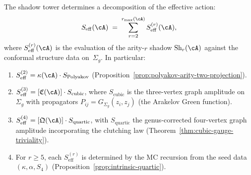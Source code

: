 \begin{proposition}
\label{prop:effective-action-decomposition}
\ClaimStatusProvedElsewhere
{}
The shadow tower determines a decomposition of the effective
action:
\begin{equation}\label{eq:effective-action-decomposition}
  S_{\mathrm{eff}}(\cA)
  \;=\;
  \sum_{r=2}^{r_{\max}(\cA)}
  S_{\mathrm{eff}}^{(r)}(\cA),
\end{equation}
where $S_{\mathrm{eff}}^{(r)}(\cA)$ is the evaluation of the
arity-$r$ shadow $\mathrm{Sh}_r(\cA)$ against the conformal
structure data on~$\Sigma_g$.  In particular:
\begin{enumerate}[label=\textup{(\roman*)}]
\item $S_{\mathrm{eff}}^{(2)} = \kappa(\cA) \cdot
  S_{\mathrm{Polyakov}}$
  \textup{(}Proposition~\textup{\ref{prop:polyakov-arity-two-projection})}.

\item $S_{\mathrm{eff}}^{(3)} =
  [\mathfrak{C}(\cA)] \cdot S_{\mathrm{cubic}}$,
  where $S_{\mathrm{cubic}}$ is the three-vertex graph
  amplitude on~$\Sigma_g$ with propagators
  $P_{ij} = G_{\Sigma_g}(z_i, z_j)$ \textup{(}the Arakelov
  Green function\textup{)}.

\item $S_{\mathrm{eff}}^{(4)} =
  [\mathfrak{Q}(\cA)] \cdot S_{\mathrm{quartic}}$, with
  $S_{\mathrm{quartic}}$ the genus-corrected four-vertex
  graph amplitude incorporating the clutching law
  \textup{(}Theorem~\textup{\ref{thm:cubic-gauge-triviality})}.

\item For $r \geq 5$, each $S_{\mathrm{eff}}^{(r)}$ is
  determined by the MC recursion from the seed data
  $(\kappa, \alpha, S_4)$
  \textup{(}Proposition~\textup{\ref{prop:intrinsic-quartic})}.
\end{enumerate}
\end{proposition}

